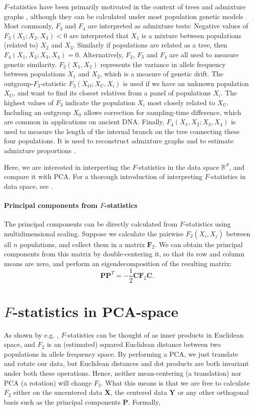 \documentclass[12pt,a4pape, fullpage]{article}
\newcommand{\MX}{\mathbf{X}} %
\newcommand{\MC}{\mathbf{C}} %
\newcommand{\MY}{\mathbf{Y}} %
\newcommand{\MF}{\mathbf{F}_2} %
\newcommand{\MP}{\mathbf{P}} %
\begin{document}
$F$-statistics have been primarily motivated in the context of trees and admixture graphs \citep{patterson2012}, although they can be calculated under most population genetic models \citep{peter2016}. Most commonly, $F_3$ and $F_4$ are interpreted as admixture tests: Negative values of  $F_3(X_1; X_2, X_3) < 0$ are interpreted that $X_1$ is a mixture between populations (related to) $X_2$ and $X_3$. Similarly if populations are related as a tree, then $F_4(X_1, X_2; X_3, X_4) =0$. Alternatively, $F_2$, $F_3$ and $F_4$ are all used to measure genetic similarity. $F_2(X_1, X_2)$ represents the variance in allele frequency between populations $X_1$ and $X_2$, which is a measure of genetic drift. The outgroup-$F_3$-statistic $F_3(X_O; X_U, X_i)$ is used if we have an unknown population $X_U$, and want to find its closest relatives from a panel of populations $X_i$. The highest values of $F_3$ indicate the population $X_i$ most closely related to $X_U$. Including an outgroup $X_0$ allows correction for sampling-time difference, which are common in applications on ancient DNA. Finally, $F_4(X_1, X_2; X_3, X_4)$ is used to measure the length of the internal branch on the tree connecting these four populations. It is used to reconstruct admixture graphs \cite{patterson2012, lipson2013} and to estimate admixture proportions \citep{petr2019, harney2020}.

Here, we are interested in interpreting the $F$-statistics in the data space $\mathbb{R}^S$, and compare it with PCA. For a thorough introduction of interpreting $F$-statistics in data space, see \cite{oteo-garcia2021}.
	
\paragraph{Principal components from $F$-statistics}
The principal components can be directly calculated from $F$-statistics using multidimensional scaling. Suppose we calculate the pairwise $F_2(X_i, X_j)$ between all $n$ populations, and collect them in a matrix $\MF$. We can obtain the principal components from this matrix by double-centering it, so that its row and column means are zero, and perform an eigendecomposition of the resulting matrix:
\begin{equation}
\MP\MP^T = - \frac{1}{2}\MC\MF\MC \text{.} \label{eq:mds}
\end{equation}

\section{$F$-statistics in PCA-space}
As shown by e.g. \cite{oteo-garcia2021}, $F$-statistics can be thought of as inner products in Euclidean space, and $F_2$ is an (estimated) squared Euclidean distance between two populations in allele frequency space. By performing a PCA, we just translate and rotate our data, but Euclidean distances and dot products are both invariant under both these operations. Hence, neither mean-centering (a translation) nor PCA (a rotation) will change $F_2$. What this means is that we are free to calculate $F_2$ either on the uncentered data $\MX$, the centered data $\MY$ or any other orthogonal basis such as the principal components $\MP$. Formally,
\end{document}
